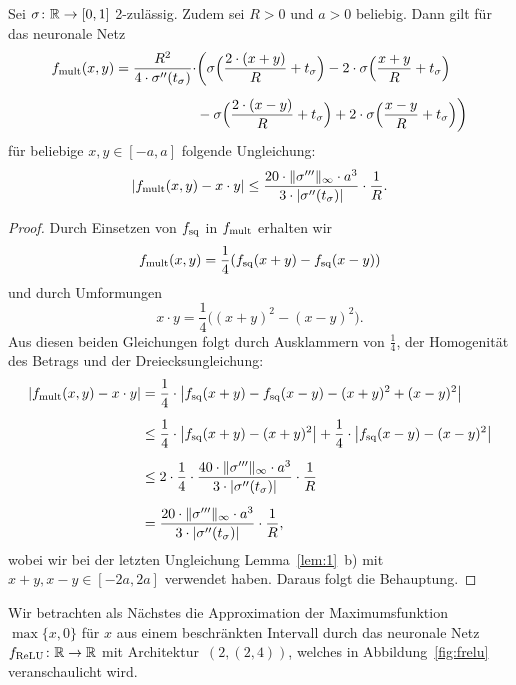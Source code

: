 \begin{lem}
  \label{lem:2}
  Sei $\sigma \colon \mathbb{R} \to [0, 1]$ 2-zulässig. Zudem sei $R > 0$ und $a > 0$ beliebig. Dann gilt für das neuronale Netz
  \begin{equation*}
  	\begin{split}
  	f_{\mathrm{mult}}(x, y) = \frac{R^2}{4 \cdot \sigma''(t_{\sigma})} \cdot & \bigg(\sigma\Big(\frac{2 \cdot (x + y)}{R} + t_{\sigma} \Big) - 2 \cdot \sigma\Big(\frac{x + y}{R} + t_{\sigma}\Big) \\[0.5em]
  	& - \sigma \Big(\frac{2 \cdot (x - y)}{R} + t_{\sigma} \Big) + 2 \cdot \sigma \Big(\frac{x - y}{R} + t_{\sigma} \Big) \bigg)
  	\end{split}
  	\end{equation*}
  	für beliebige $x, y \in [-a, a]$ folgende Ungleichung:
  	$$|f_{\mathrm{mult}}(x, y) - x \cdot y| \leq \frac{20 \cdot \|\sigma'''\|_{\infty} \cdot a ^3}{3 \cdot |\sigma''(t_{\sigma})|} \cdot \frac{1}{R}.$$
  \end{lem}
  \begin{proof}
  Durch Einsetzen von $f_{\mathrm{sq}}$ in $f_{\mathrm{mult}}$ erhalten wir $$f_{\mathrm{mult}}(x,y) = \frac{1}{4}(f_{\mathrm{sq}}(x + y) - f_{\mathrm{sq}}(x - y))$$ und durch Umformungen $$x \cdot y = \frac{1}{4}\big((x + y)^2 - (x - y)^2\big).$$
  Aus diesen beiden Gleichungen folgt durch Ausklammern von $\frac{1}{4}$, der Homogenität des Betrags und der Dreiecksungleichung:
  \begin{equation*}
  \begin{split}
  |f_{\mathrm{mult}}(x, y) - x \cdot y| & = \frac{1}{4} \cdot \big|f_{\mathrm{sq}}(x + y) - f_{\mathrm{sq}}(x - y) - (x + y)^2 + (x - y)^2\big| \\[0.5em]
  & \leq \frac{1}{4} \cdot \big|f_{\mathrm{sq}}(x + y) - (x + y)^2\big| + \frac{1}{4}\cdot\big|f_{\mathrm{sq}}(x - y) - (x - y)^2\big| \\[0.5em]
  & \leq 2 \cdot \frac{1}{4} \cdot \frac{40 \cdot \|\sigma'''\|_{\infty} \cdot a^3}{3 \cdot |\sigma''(t_{\sigma})|} \cdot \frac{1}{R} \\[0.5em]
  & = \frac{20 \cdot \|\sigma'''\|_{\infty} \cdot a ^3}{3 \cdot |\sigma''(t_{\sigma})|} \cdot \frac{1}{R},
  \end{split}
\end{equation*}   
wobei wir bei der letzten Ungleichung Lemma~\ref{lem:1}~b) mit $x + y, x - y \in [-2a, 2a]$ verwendet haben. Daraus folgt die Behauptung.
  \end{proof}
Wir betrachten als Nächstes die Approximation der Maximumsfunktion $\max\{x, 0\}$ für $x$ aus einem beschränkten Intervall durch das neuronale Netz $f_{\mathrm{ReLU}}\colon \mathbb{R} \to \mathbb{R}$ mit Architektur~$(2,(2,4))$, welches in Abbildung~\ref{fig:frelu} veranschaulicht wird.

